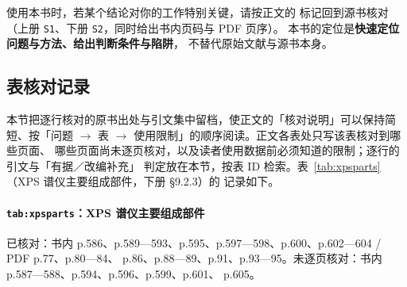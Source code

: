 \begin{crosscheck}
使用本书时，若某个结论对你的工作特别关键，请按正文的 \src{} 标记回到源书核对
（上册 \texttt{S1}、下册 \texttt{S2}，同时给出书内页码与 PDF 页序）。
本书的定位是\textbf{快速定位问题与方法、给出判断条件与陷阱}，
不替代原始文献与源书本身。
\end{crosscheck}

\subsection{表核对记录}\label{sec:table-audit}

本节把逐行核对的原书出处与引文集中留档，使正文的「核对说明」可以保持简短、按「问题
$\rightarrow$ 表 $\rightarrow$ 使用限制」的顺序阅读。正文各表处只写该表核对到哪些页面、
哪些页面尚未逐页核对，以及读者使用数据前必须知道的限制；逐行的引文与「有据／改编补充」
判定放在本节，按表 ID 检索。表~\ref{tab:xpsparts}（XPS 谱仪主要组成部件，下册 §9.2.3）的
记录如下。

\paragraph{\texttt{tab:xpsparts}：XPS 谱仪主要组成部件}
已核对：书内 p.586、p.589—593、p.595、p.597—598、p.600、p.602—604 / PDF p.77、p.80—84、
p.86、p.88—89、p.91、p.93—95。未逐页核对：书内 p.587—588、p.594、p.596、p.599、p.601、
p.605。

